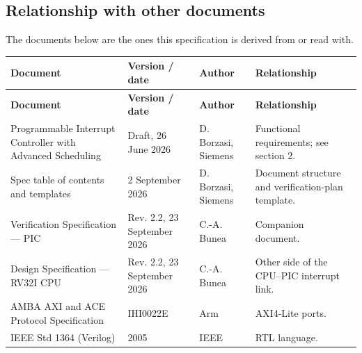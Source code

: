 \documentclass[11pt]{article}
\begin{document}
\subsection{Relationship with other documents}
\noindent The documents below are the ones this specification is derived from or read with.\par\medskip
{\small
\begin{longtable}{@{}L{0.3400\dimexpr\linewidth-36pt\relax}L{0.2200\dimexpr\linewidth-36pt\relax}L{0.1800\dimexpr\linewidth-36pt\relax}L{0.2600\dimexpr\linewidth-36pt\relax}@{}}
\toprule
\textbf{Document} & \textbf{Version / date} & \textbf{Author} & \textbf{Relationship} \\ \midrule
\endfirsthead
\toprule
\textbf{Document} & \textbf{Version / date} & \textbf{Author} & \textbf{Relationship} \\ \midrule
\endhead
Programmable Interrupt Controller with Advanced Scheduling & Draft, 26 June 2026 & D. Borzasi, Siemens & Functional requirements; see section 2. \\ \addlinespace[3pt]
Spec table of contents and templates & 2 September 2026 & D. Borzasi, Siemens & Document structure and verification-plan template. \\ \addlinespace[3pt]
Verification Specification — PIC & Rev. 2.2, 23 September 2026 & C.-A. Bunea & Companion document. \\ \addlinespace[3pt]
Design Specification — RV32I CPU & Rev. 2.2, 23 September 2026 & C.-A. Bunea & Other side of the CPU–PIC interrupt link. \\ \addlinespace[3pt]
AMBA AXI and ACE Protocol Specification & IHI0022E & Arm & AXI4-Lite ports. \\ \addlinespace[3pt]
IEEE Std 1364 (Verilog) & 2005 & IEEE & RTL language. \\*
\bottomrule\end{longtable}}

\end{document}

